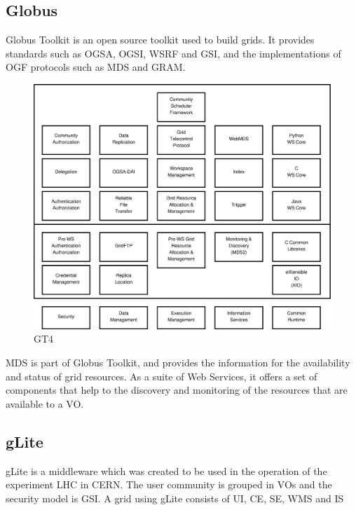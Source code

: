 \subsection{Globus}

Globus Toolkit is an open source toolkit used to build grids. It provides standards such as \ac{OGSA}, \ac{OGSI}, \ac{WSRF} and \ac{GSI}, and the implementations of \ac{OGF} protocols such as \ac{MDS} and \ac{GRAM}.

\begin{figure}[htb]
\centering
 \includegraphics[width=130mm]{images/globus.eps}
\caption{\ac{GT4}}
\label{figure:globus}
\end{figure}

\ac{MDS} is part of Globus Toolkit, and provides the information for the availability and status of grid resources. As a suite of Web Services, it offers a set of components that help to the discovery and monitoring of the resources that are available to a \ac{VO}.

\subsection{gLite}

gLite is a middleware which was created to be used in the operation of the experiment \ac{LHC} in CERN. The user community is grouped in \acp{VO} and the security model is \ac{GSI}. A grid using gLite consists of \ac{UI}, \ac{CE}, \ac{SE}, \ac{WMS} and \ac{IS}

